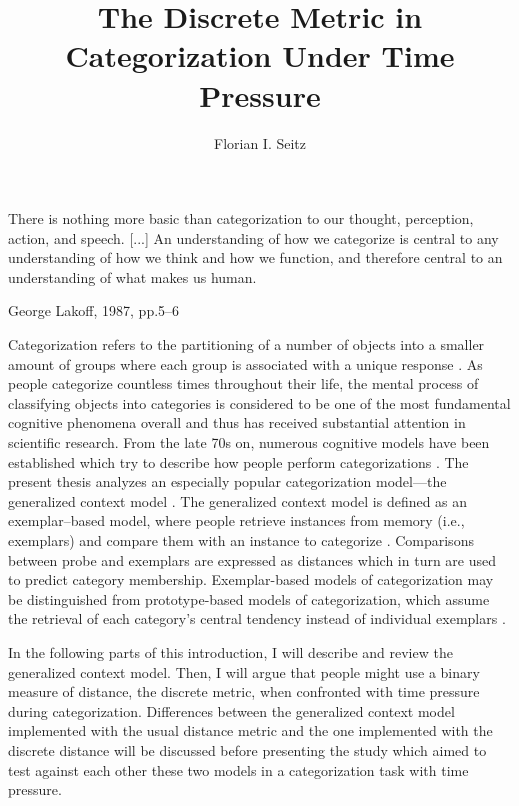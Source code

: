 \documentclass[a4paper,man,natbib]{apa6}
\title{The Discrete Metric in Categorization Under Time Pressure}
\author{Florian I. Seitz}
\affiliation{University of Basel}
\begin{document}
\maketitle

\epigraph{There is nothing more basic than categorization to our thought, perception, action, and speech. [...] An understanding of how we categorize is central to any understanding of how we think and how we function, and therefore central to an understanding of what makes us human.}{George Lakoff, 1987, pp.5--6}

Categorization refers to the partitioning of a number of objects into a smaller amount of groups where each group is associated with a unique response \citep{cohen2005bridging, nosofsky1986attention, nosofsky1989further}. As people categorize countless times throughout their life, the mental process of classifying objects into categories is considered to be one of the most fundamental cognitive phenomena overall \citep{ashby2001categorization, bruner1956study, cohen2005bridging, lakoff1987women, goldstone2003concepts} and thus has received substantial attention in scientific research. From the late 70s on, numerous cognitive models have been established which try to describe how people perform categorizations \citep[for an overview over the diverse models of categorization, see][]{kruschke2008models,wills2013models}. The present thesis analyzes an especially popular categorization model---the generalized context model \citep{nosofsky1984choice, nosofsky1986attention, nosofsky2011generalized}. The generalized context model is defined as an exemplar--based model, where people retrieve instances from memory (i.e., exemplars) and compare them with an instance to categorize \citep[i.e., the probe;][]{medin1978context}. Comparisons between probe and exemplars are expressed as distances which in turn are used to predict category membership. Exemplar-based models of categorization may be distinguished from prototype-based models of categorization, which assume the retrieval of each category's central tendency instead of individual exemplars \citep{reed1972pattern, smith1997straight, smith1998prototypes}. 

In the following parts of this introduction, I will describe and review the generalized context model. Then, I will argue that people might use a binary measure of distance, the discrete metric, when confronted with time pressure during categorization. Differences between the generalized context model implemented with the usual distance metric and the one implemented with the discrete distance will be discussed before presenting the study which aimed to test against each other these two models in a categorization task with time pressure.
\end{document}
